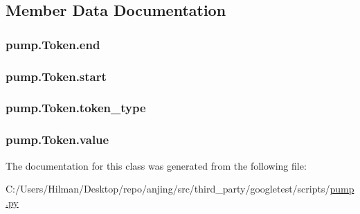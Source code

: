 \subsection{Member Data Documentation}
\hypertarget{classpump_1_1_token_abb88c0ece4274cfd974fd01d0468953c}{}
\subsubsection[{end}]{\setlength{\rightskip}{0pt plus 5cm}pump.\+Token.\+end}\label{classpump_1_1_token_abb88c0ece4274cfd974fd01d0468953c}
\hypertarget{classpump_1_1_token_a53e3333a770bc8773224a5af78bca5bb}{}
\subsubsection[{start}]{\setlength{\rightskip}{0pt plus 5cm}pump.\+Token.\+start}\label{classpump_1_1_token_a53e3333a770bc8773224a5af78bca5bb}
\hypertarget{classpump_1_1_token_aeac105b76f6af13c8c64ba0a94e37d90}{}
\subsubsection[{token\+\_\+type}]{\setlength{\rightskip}{0pt plus 5cm}pump.\+Token.\+token\+\_\+type}\label{classpump_1_1_token_aeac105b76f6af13c8c64ba0a94e37d90}
\hypertarget{classpump_1_1_token_a5b7ab395a380b775b2bf0a8b0abfda86}{}
\subsubsection[{value}]{\setlength{\rightskip}{0pt plus 5cm}pump.\+Token.\+value}\label{classpump_1_1_token_a5b7ab395a380b775b2bf0a8b0abfda86}


The documentation for this class was generated from the following file\+:\begin{DoxyCompactItemize}
\item 
C\+:/\+Users/\+Hilman/\+Desktop/repo/anjing/src/third\+\_\+party/googletest/scripts/\hyperlink{pump_8py}{pump.\+py}\end{DoxyCompactItemize}
